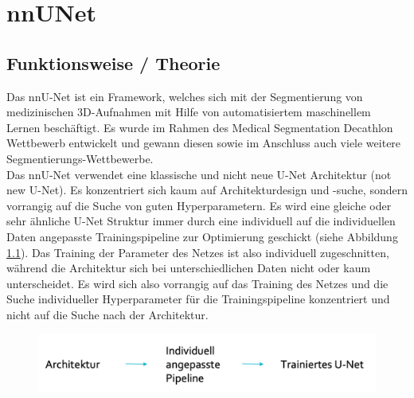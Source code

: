 \chapter{nnUNet}
\label{ch:nnunet}


\section{Funktionsweise / Theorie}


\label{tab:multicol}

Das nnU-Net ist ein Framework, welches sich mit der Segmentierung von medizinischen 3D-Aufnahmen mit Hilfe von automatisiertem maschinellem Lernen beschäftigt. Es wurde im Rahmen des Medical Segmentation Decathlon Wettbewerb entwickelt und gewann diesen sowie im Anschluss auch viele weitere Segmentierungs-Wettbewerbe. \\
Das nnU-Net verwendet eine klassische und nicht neue U-Net Architektur (not new U-Net). Es konzentriert sich kaum auf  Architekturdesign und -suche, sondern vorrangig auf die Suche von guten Hyperparametern. Es wird eine gleiche oder sehr ähnliche U-Net Struktur immer durch eine individuell auf die individuellen Daten angepasste Trainingspipeline zur Optimierung geschickt (siehe Abbildung \ref{pic:nnUnet_Basisschema}). Das Training der Parameter des Netzes ist also individuell zugeschnitten, während die Architektur sich bei unterschiedlichen Daten nicht oder kaum unterscheidet. Es wird sich also vorrangig auf das Training des Netzes und die Suche individueller Hyperparameter für die Trainingspipeline konzentriert und nicht auf die Suche nach der Architektur. 

\begin{figure}[H]
	
	\centering
	\includegraphics[scale=0.3]{Pictures/nnUnet/Bild01.png}
	\caption{}
	\label{pic:nnUnet_Basisschema}
\end{figure}



